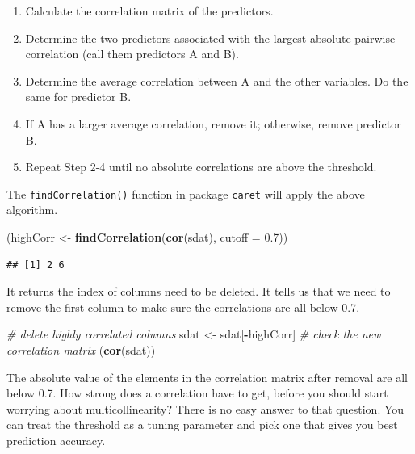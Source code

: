 \documentclass[12pt,]{krantz}
\makeatletter
\newenvironment{Shaded}{\begin{snugshade}}{\end{snugshade}}
\newcommand{\CommentTok}[1]{\textcolor[rgb]{0.37,0.37,0.37}{\textit{#1}}}
\newcommand{\DataTypeTok}[1]{\textcolor[rgb]{0.27,0.27,0.27}{#1}}
\newcommand{\FloatTok}[1]{\textcolor[rgb]{0.06,0.06,0.06}{#1}}
\newcommand{\KeywordTok}[1]{\textcolor[rgb]{0.27,0.27,0.27}{\textbf{#1}}}
\newcommand{\NormalTok}[1]{#1}
\newcommand{\OperatorTok}[1]{\textcolor[rgb]{0.43,0.43,0.43}{\textbf{#1}}}
\newcommand{\StringTok}[1]{\textcolor[rgb]{0.5,0.5,0.5}{#1}}
\providecommand{\tightlist}{%
  \setlength{\itemsep}{0pt}\setlength{\parskip}{0pt}}
\renewenvironment{quote}{\begin{VF}}{\end{VF}}
\newenvironment{kframe}{%
\medskip{}
\setlength{\fboxsep}{.8em}
 \def\at@end@of@kframe{}%
 \ifinner\ifhmode%
  \def\at@end@of@kframe{\end{minipage}}%
  \begin{minipage}{\columnwidth}%
 \fi\fi%
 \def\FrameCommand##1{\hskip\@totalleftmargin \hskip-\fboxsep
 \colorbox{shadecolor}{##1}\hskip-\fboxsep
     \hskip-\linewidth \hskip-\@totalleftmargin \hskip\columnwidth}%
 \MakeFramed {\advance\hsize-\width
   \@totalleftmargin\z@ \linewidth\hsize
   \@setminipage}}%
 {\par\unskip\endMakeFramed%
 \at@end@of@kframe}
\renewenvironment{Shaded}{\begin{kframe}}{\end{kframe}}
\makeatother
\begin{document}
\begin{quote}
\begin{enumerate}
\def\labelenumi{(\arabic{enumi})}
\tightlist
\item
  Calculate the correlation matrix of the predictors.
\item
  Determine the two predictors associated with the largest absolute pairwise correlation (call them predictors A and B).
\item
  Determine the average correlation between A and the other variables. Do the same for predictor B.
\item
  If A has a larger average correlation, remove it; otherwise, remove predictor B.
\item
  Repeat Step 2-4 until no absolute correlations are above the threshold.
\end{enumerate}
\end{quote}

The \texttt{findCorrelation()} function in package \texttt{caret} will apply the above algorithm.

\begin{Shaded}
\begin{Highlighting}[]
\NormalTok{(highCorr <-}\StringTok{ }\KeywordTok{findCorrelation}\NormalTok{(}\KeywordTok{cor}\NormalTok{(sdat), }\DataTypeTok{cutoff =} \FloatTok{0.7}\NormalTok{))}
\end{Highlighting}
\end{Shaded}

\begin{verbatim}
## [1] 2 6
\end{verbatim}

It returns the index of columns need to be deleted. It tells us that we need to remove the first column to make sure the correlations are all below 0.7.

\begin{Shaded}
\begin{Highlighting}[]
\CommentTok{# delete highly correlated columns}
\NormalTok{sdat <-}\StringTok{ }\NormalTok{sdat[}\OperatorTok{-}\NormalTok{highCorr]}
\CommentTok{# check the new correlation matrix}
\NormalTok{(}\KeywordTok{cor}\NormalTok{(sdat))}
\end{Highlighting}
\end{Shaded}

The absolute value of the elements in the correlation matrix after removal are all below 0.7. How strong does a correlation have to get, before you should start worrying about multicollinearity? There is no easy answer to that question. You can treat the threshold as a tuning parameter and pick one that gives you best prediction accuracy.
\end{document}
